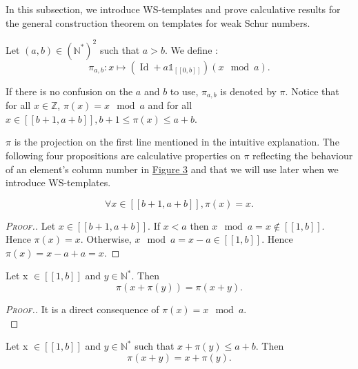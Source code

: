 In this subsection, we introduce WS-templates and prove calculative results for the general construction
theorem on templates for weak Schur numbers.

\begin{definition}
Let \((a,b) \in (\mathbb{N}^*)^2\) such that \(a>b\). We define :
\[ \pi_{a,b}:x \longmapsto (\operatorname{Id}+a\mathds{1}_{ [\![0,b]\!]})(x \mod a).\]
\end{definition}

\begin{sloppypar}
If there is no confusion on the \(a\) and \(b\) to use, \(\pi_{a, b}\) is denoted by \(\pi\). Notice that for all \(x \in \mathbb{Z}\), 
\({\pi(x) = x \mod a}\) and for all \(x \in [\![b + 1, a + b]\!], b + 1 \leqslant \pi(x) \leqslant a + b\).
\end{sloppypar}

\begin{sloppypar}
\(\pi\) is the projection on the first line mentioned in the intuitive explanation. The following four propositions are
calculative properties on \(\pi\) reflecting the behaviour of an element's column number in \hyperref[SchemaWS]{Figure 3} and
that we will use later when we introduce WS-templates.
\end{sloppypar}

\begin{proposition}
\label{prop1}
\[
\forall x \in [\![b + 1, a + b]\!], \pi(x) = x.
\]
\end{proposition}

\begin{proof}[\textsc{Proof.}]
\begin{sloppypar}
Let \(x \in [\![b + 1, a + b]\!]\). If \(x < a\) then \(x \mod a = x \notin [\![1, b]\!]\). Hence \(\pi(x) = x\).
Otherwise, \({x \mod a = x - a \in [\![1, b]\!]}\). Hence \({\pi(x) = x - a + a = x}\).
\end{sloppypar}
\end{proof}

\begin{proposition}
\label{prop2}
Let x \(\in [\![1,b]\!]\) and \(y \in \mathbb{N}^*\). Then
\[
\pi(x+\pi(y)) = \pi(x+y).
\]
\end{proposition}

\begin{proof}[\textsc{Proof.}]
It is a direct consequence of \(\pi(x) = x \mod a\). \\
\end{proof}

\begin{proposition}
\label{prop3}
Let x \(\in [\![1,b]\!]\) and \(y \in \mathbb{N}^*\) such that \(x+\pi(y) \leqslant a+b\). Then
\[
\pi(x+y)=x+\pi(y).
\]
\end{proposition}

